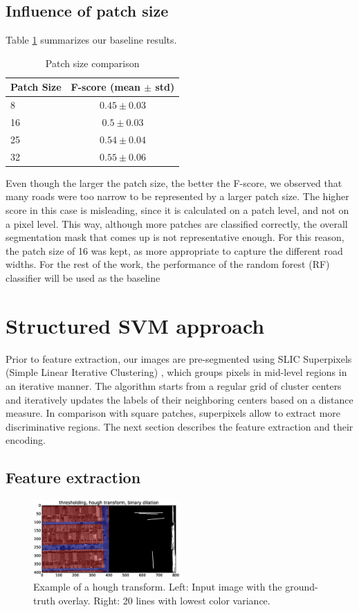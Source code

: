 \documentclass[10pt,conference,compsocconf]{IEEEtran}
\begin{document}
	\subsection{Influence of patch size}
    Table \ref{patch_size} summarizes our baseline results.
	\begin{table}[h]	
	\centering
	\begin{tabular}{lc}
		\hline \hline		
		\textbf{Patch Size} &  \textbf{F-score (mean $\pm$ std)} \\
		\hline
		8 & $0.45 \pm 0.03$ \\
		16 & $0.5 \pm 0.03$ \\
		25 & $0.54 \pm 0.04$ \\
		32 & $0.55 \pm 0.06$ \\
		\hline
	\end{tabular}
	\caption{\label{patch_size}Patch size comparison}
	\end{table}
	Even though the larger the patch size, the better the F-score, we observed that many roads were too narrow to be represented by a larger patch size. The higher score in this case is misleading, since it is calculated on a patch level, and not on a pixel level. This way, although more patches are classified correctly, the overall segmentation mask that comes up is not representative enough. For this reason, the patch size of 16 was kept, as more appropriate to capture the different road widths.
For the rest of the work,
  the performance of the random forest (RF) classifier will be used as the
  baseline
	\section{Structured SVM approach}
  Prior to feature extraction, our images are pre-segmented using	SLIC
  Superpixels (Simple Linear Iterative Clustering) \cite{achanta12}, which
  groups pixels in mid-level regions in an iterative manner. The algorithm
  starts from a regular grid of cluster centers and iteratively updates the
  labels of their neighboring centers based on a distance measure. In comparison
  with square patches, superpixels allow to extract more discriminative regions.
  The next section describes the feature extraction and their encoding.
\subsection{Feature extraction}

\begin{figure}[htb]
\centering
\includegraphics[width=0.5\textwidth]{pics/ex_hough.eps}
\caption{\label{fig:hough}
Example of a hough transform. Left: Input image with the ground-truth overlay. Right: 20 lines with lowest color variance.}
\end{figure}
\end{document}
